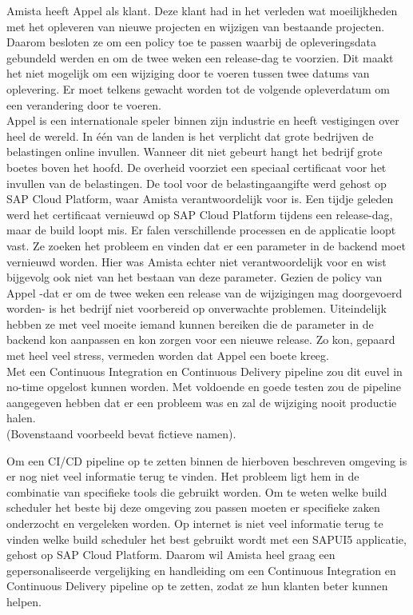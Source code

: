 Amista heeft Appel als klant. Deze klant had in het verleden wat moeilijkheden met het opleveren van nieuwe projecten en wijzigen van bestaande projecten. Daarom besloten ze om een policy toe te passen waarbij de opleveringsdata gebundeld werden en om de twee weken een release-dag te voorzien. Dit maakt het niet mogelijk om een wijziging door te voeren tussen twee datums van oplevering. Er moet telkens gewacht worden tot de volgende opleverdatum om een verandering door te voeren.\\
Appel is een internationale speler binnen zijn industrie en heeft vestigingen over heel de wereld. In één van de landen is het verplicht dat grote bedrijven de belastingen online invullen. Wanneer dit niet gebeurt hangt het bedrijf grote boetes boven het hoofd. De overheid voorziet een speciaal certificaat voor het invullen van de belastingen. De tool voor de belastingaangifte werd gehost op SAP Cloud Platform, waar Amista verantwoordelijk voor is. Een tijdje geleden werd het certificaat vernieuwd op SAP Cloud Platform tijdens een release-dag, maar de build loopt mis. Er falen verschillende processen en de applicatie loopt vast. Ze zoeken het probleem en vinden dat er een parameter in de backend moet vernieuwd worden. Hier was Amista echter niet verantwoordelijk voor en wist bijgevolg ook niet van het bestaan van deze parameter. Gezien de policy van Appel -dat er om de twee weken een release van de wijzigingen mag doorgevoerd worden- is het bedrijf niet voorbereid op onverwachte problemen. Uiteindelijk hebben ze met veel moeite iemand kunnen bereiken die de parameter in de backend kon aanpassen en kon zorgen voor een nieuwe release. Zo kon, gepaard met heel veel stress, vermeden worden dat Appel een boete kreeg.\\
Met een Continuous Integration en Continuous Delivery pipeline zou dit euvel in no-time opgelost kunnen worden. Met voldoende en goede testen zou de pipeline aangegeven hebben dat er een probleem was en zal de wijziging nooit productie halen.\\
(Bovenstaand voorbeeld bevat fictieve namen).

Om een CI/CD pipeline op te zetten binnen de hierboven beschreven omgeving is er nog niet veel informatie terug te vinden. Het probleem ligt hem in de combinatie van specifieke tools die gebruikt worden. Om te weten welke build scheduler het beste bij deze omgeving zou passen moeten er specifieke zaken onderzocht en vergeleken worden. Op internet is niet veel informatie terug te vinden welke build scheduler het best gebruikt wordt met een SAPUI5 applicatie, gehost op SAP Cloud Platform. Daarom wil Amista heel graag een gepersonaliseerde vergelijking en handleiding om een Continuous Integration en Continuous Delivery pipeline op te zetten, zodat ze hun klanten beter kunnen helpen.

